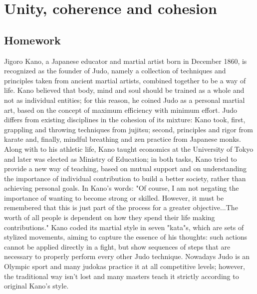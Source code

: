 
\chapter{Unity, coherence and cohesion}

\section{Homework}

Jigoro Kano, a Japanese educator and martial artist born in
December 1860, is recognized as the founder of Judo, namely a
collection of techniques and principles taken from ancient martial
artists, combined together to be a way of life.  Kano believed that body,
mind and soul should be trained as a whole and not as individual
entities; for this reason, he coined Judo as a personal martial
art, based on the concept of maximum efficiency with minimum
effort.  Judo differs from existing disciplines in the cohesion of
its mixture: Kano took, first, grappling and throwing techniques
from jujitsu; second, principles and rigor from karate and,
finally, mindful breathing and zen practice from Japanese
monks. Along with to his athletic life, Kano taught economics at
the University of Tokyo and later was elected as Ministry of
Education; in both tasks, Kano tried to provide a new way of
teaching, based on mutual support and on understanding the
importance of individual contribution to build a better society,
rather than achieving personal goals. In Kano's words: "Of
course, I am not negating the importance of wanting to become
strong or skilled. However, it must be remembered that this is
just part of the process for a greater objective...The worth of
all people is dependent on how they spend their life making
contributions."  Kano coded its martial style in seven "kata"s,
which are sets of stylized movements, aiming to capture the essence
of his thoughts: such actions cannot be applied directly in a
fight, but show sequences of steps that are necessary to properly
perform every other Judo technique.  Nowadays Judo is an Olympic
sport and many judokas practice it at all competitive levels;
however, the traditional way isn't lost and many masters teach it
strictly according to original Kano's style.
